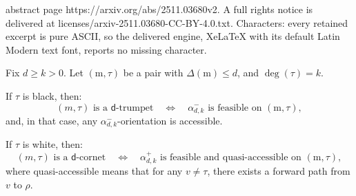 \documentclass[10pt,a4paper]{amsart}
\newcommand{\dcorn}{$\mathsf{d}$-cornet}
\newcommand{\dtrum}{$\mathsf{d}$-trumpet}
\renewcommand{\rm}{\mathrm{m}}
\begin{document}
abstract page https://arxiv.org/abs/2511.03680v2. A full rights notice is delivered at licenses/arxiv-2511.03680-CC-BY-4.0.txt. Characters: every retained excerpt is pure ASCII, so the delivered engine, XeLaTeX with its default Latin Modern text font, reports no missing character.
\begin{lemm}\label{lemm: Characterization tightness}
Fix $d\geq k >0$.  Let $(\rm,\tau)$ be a pair with $\Delta(\rm)\leq d$, and $\deg(\tau)=k$.

If $\tau$ is black, then: 
\[
	(m,\tau)\text{ is a \dtrum}\quad\Leftrightarrow\quad \alpha_{d,k}^-\text{ is feasible on }(\rm,\tau),
\]
and, in that case, any $\alpha_{d,k}^-$-orientation is accessible.

If $\tau$ is white, then: 
\[
	(m,\tau)\text{ is a \dcorn}\quad\Leftrightarrow\quad \alpha_{d,k}^+\text{ is feasible and quasi-accessible on }(\rm,\tau),
\]
where quasi-accessible means that for any $v\neq \tau$, there exists a forward path from $v$ to $\rho$. 
\end{lemm}
\end{document}
